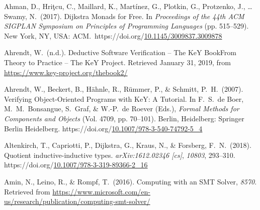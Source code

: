 \documentclass[12pt,twoside]{article}
\begin{document}
{\begin{thebibliography}{222}
\mdbibitemlabel{}Ahman, D., Hriţcu, C., Maillard, K., Martínez, G., Plotkin, G., Protzenko, J., … Swamy, N.~(2017). Dijkstra Monads for Free. In \emph{Proceedings of the 44th ACM SIGPLAN Symposium on Principles of Programming Languages} (pp. 515–529). New York, NY, USA: ACM.~https://doi.org/\href{https://dx.doi.org/10.1145/3009837.3009878}{10.1145/3009837.3009878}\label{ahman_dijkstra_2017}%

\mdbibitemlabel{}Ahrendt, W.~(n.d.). Deductive Software Verification – The KeY BookFrom Theory to Practice – The KeY Project. Retrieved January 31, 2019, from \href{https://www.key-project.org/thebook2/}{{\ttfamily https://\hspace{0pt}www.\hspace{0pt}key-\hspace{0pt}project.\hspace{0pt}org/\hspace{0pt}thebook2/\hspace{0pt}}}\label{ahrendt_deductive_nodate}%

\mdbibitemlabel{}Ahrendt, W., Beckert, B., Hähnle, R., Rümmer, P., \& Schmitt, P.~H.~(2007). Verifying Object-Oriented Programs with KeY: A Tutorial. In F.~S.~de Boer, M.~M.~Bonsangue, S.~Graf, \& W.-P.~de Roever (Eds.), \emph{Formal Methods for Components and Objects} (Vol. 4709, pp. 70–101). Berlin, Heidelberg: Springer Berlin Heidelberg. https://doi.org/\href{https://dx.doi.org/10.1007/978-3-540-74792-5_4}{10.1007/978-3-540-74792-5\_4}\label{hutchison_verifying_2007}%

\mdbibitemlabel{}Altenkirch, T., Capriotti, P., Dijkstra, G., Kraus, N., \& Forsberg, F.~N.~(2018). Quotient inductive-inductive types. \emph{arXiv:1612.02346 {}[cs]}, \emph{10803}, 293–310. https://doi.org/\href{https://dx.doi.org/10.1007/978-3-319-89366-2_16}{10.1007/978-3-319-89366-2\_16}\label{altenkirch_quotient_2018}%

\mdbibitemlabel{}Amin, N., Leino, R., \& Rompf, T.~(2016). Computing with an SMT Solver, \emph{8570}. Retrieved from \href{https://www.microsoft.com/en-us/research/publication/computing-smt-solver/}{{\ttfamily https://\hspace{0pt}www.\hspace{0pt}microsoft.\hspace{0pt}com/\hspace{0pt}en-\hspace{0pt}us/\hspace{0pt}research/\hspace{0pt}publication/\hspace{0pt}computing-\hspace{0pt}smt-\hspace{0pt}solver/\hspace{0pt}}}\label{amin_computing_2016}%


\end{thebibliography}}
\end{document}
